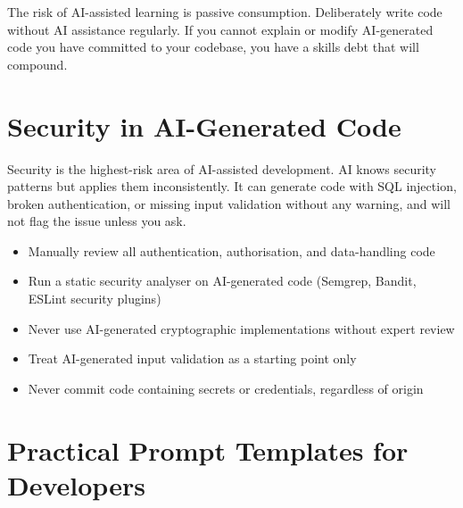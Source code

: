 \begin{warnbox}
The risk of AI-assisted learning is passive consumption.
Deliberately write code without AI assistance regularly.
If you cannot explain or modify AI-generated code you have committed to your codebase,
you have a skills debt that will compound.
\end{warnbox}

\section{Security in AI-Generated Code}
\label{sec:security}

Security is the highest-risk area of AI-assisted development.
AI knows security patterns but applies them inconsistently.
It can generate code with SQL injection, broken authentication, or missing input
validation without any warning, and will not flag the issue unless you ask.

\begin{warnbox}
\begin{itemize}
  \item Manually review all authentication, authorisation, and data-handling code
  \item Run a static security analyser on AI-generated code (Semgrep, Bandit, ESLint
        security plugins)
  \item Never use AI-generated cryptographic implementations without expert review
  \item Treat AI-generated input validation as a starting point only
  \item Never commit code containing secrets or credentials, regardless of origin
\end{itemize}
\end{warnbox}

\section{Practical Prompt Templates for Developers}
\label{sec:dev-templates}

